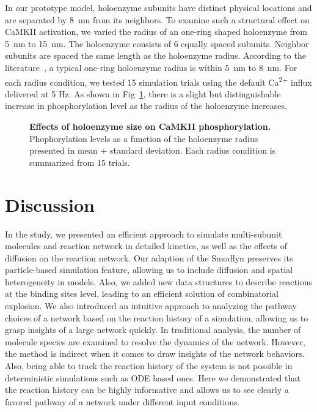 \documentclass[10pt,letterpaper]{article}
\begin{document}
In our prototype model, holoenzyme subunits have distinct physical locations and are separated by \SI{8}{\nm} from its neighbors. To examine such a structural effect on CaMKII activation, we varied the radius of an one-ring shaped holoenzyme from \SI{5}{\nm} to \SI{15}{\nm}. The holoenzyme consists of 6 equally spaced subunits. Neighbor subunits are spaced the same length as the holoenzyme radius. According to the literature~\cite{Chao:2011iw,Gaertner:2004jk}, a typical one-ring holoenzyme radius is within \SI{5}{\nm} to \SI{8}{\nm}. For each radius condition, we tested 15 simulation trials using the default Ca\textsuperscript{2+} influx delivered at 5 Hz. As shown in Fig~\ref{fig13}, there is a slight but distinguishable increase in phosphorylation level as the radius of the holoenzyme increases.

\begin{figure}[!h]
	\caption{{\bf Effects of holoenzyme size on CaMKII phosphorylation.}
	Phophorylation levels as a function of the holoenzyme radius presented in mean + standard deviation. Each radius condition is summarized from 15 trials.
	}
\label{fig13}
\end{figure}


\section*{Discussion}
In the study, we presented an efficient approach to simulate multi-subunit molecules and reaction network in detailed kinetics, as well as the effects of diffusion on the reaction network. Our adaption of the Smodlyn preserves its particle-based simulation feature, allowing us to include diffusion and spatial heterogeneity in models. Also, we added new data structures to describe reactions at the binding sites level, leading to an efficient solution of combinatorial explosion. We also introduced an intuitive approach to analyzing the pathway choices of a network based on the reaction history of a simulation, allowing us to grasp insights of a large network quickly. In traditional analysis, the number of molecule species are examined to resolve the dynamics of the network. However, the method is indirect when it comes to draw insights of the network behaviors. Also, being able to track the reaction history of the system is not possible in deterministic simulations such as ODE based ones. Here we demonstrated that the reaction history can be highly informative and allows us to see clearly a favored pathway of a network under different input conditions.
\end{document}
